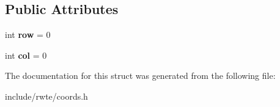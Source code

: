 \subsection*{Public Attributes}
\begin{DoxyCompactItemize}
\item 
\mbox{\label{structCell_a85d2a7af6195f5196574790fbc1becfd}} 
int {\bfseries row} = 0
\item 
\mbox{\label{structCell_a09e2f07cb87b7ae5898be20927cf28d1}} 
int {\bfseries col} = 0
\end{DoxyCompactItemize}


The documentation for this struct was generated from the following file\+:\begin{DoxyCompactItemize}
\item 
include/rwte/coords.\+h\end{DoxyCompactItemize}
